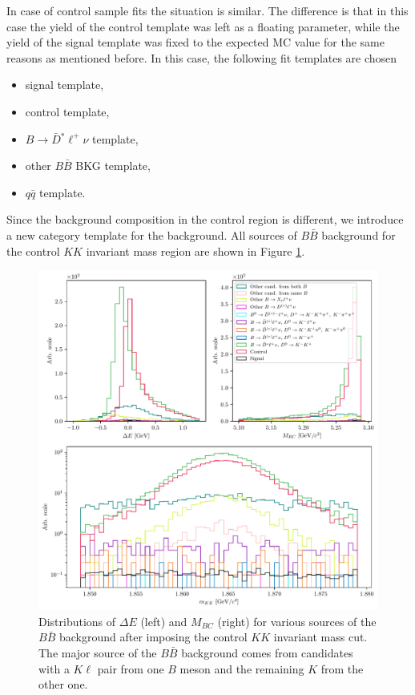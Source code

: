 In case of control sample fits the situation is similar. The difference is that in this case the yield of the control template was left as a floating parameter, while the yield of the signal template was fixed to the expected MC value for the same reasons as mentioned before. In this case, the following fit templates are chosen
\begin{itemize}
	\item signal template,
	\item control template,
	\item $B \to \bar D {}^* \ell^+ \nu$ template,
	\item other $B \bar B$ BKG template,
	\item $q \bar q$ template.
\end{itemize}
Since the background composition in the control region is different, we introduce a new category template for the background.  All sources of $B \bar B$ background for the control $KK$ invariant mass region are shown in Figure \ref{fig:cs_BKG_comp}.

\begin{figure}[H]
	\centering
	\captionsetup{width=0.8\linewidth}
	\includegraphics[width=\linewidth]{fig/cs_BKG_composition_before}
	\caption{Distributions of $\Delta E$ (left) and $M_{BC}$ (right) for various sources of the $B \bar B$ background after imposing the control $KK$ invariant mass cut. The major source of the $B \bar B$ background comes from candidates with a $K\ell$ pair from one $B$ meson and the remaining $K$ from the other one.}
	\label{fig:cs_BKG_comp}
\end{figure}

